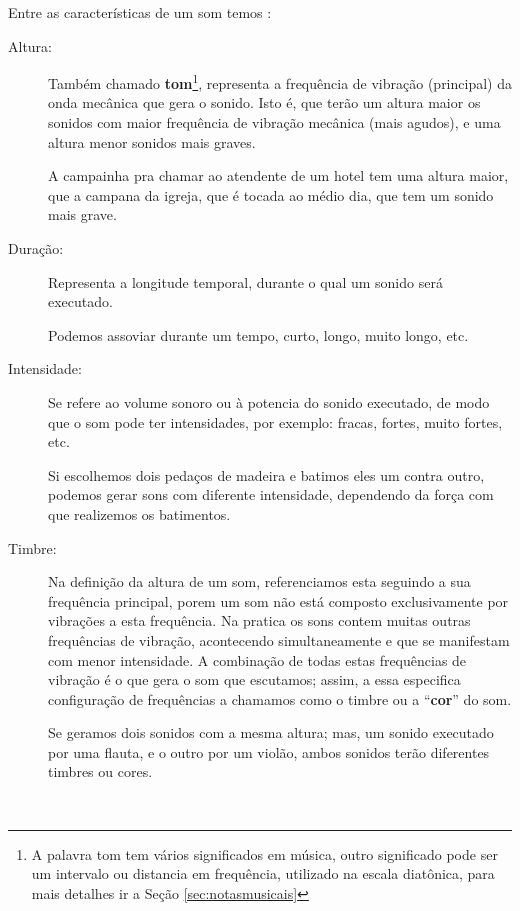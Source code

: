 Entre as características de um som temos \cite[pp. 12]{medteoria} :
\begin{description}
\item [Altura:] \label{sec:pos:Altura} 
Também chamado \textbf{tom}\footnote{A palavra tom tem vários significados em música, 
outro significado pode ser um intervalo ou distancia em frequência, 
utilizado na escala diatônica, para mais detalhes ir a Seção \ref{sec:notasmusicais}}, representa a frequência de vibração (principal) da onda mecânica que gera o sonido.
Isto é, que terão um altura maior os sonidos com maior frequência de vibração mecânica (mais agudos), 
e uma altura menor sonidos mais graves.
\begin{example}
A campainha pra chamar ao atendente de um hotel tem uma altura maior,
que a campana da igreja, que é tocada ao médio dia, que tem um sonido mais grave.
\end{example} 
\item [Duração:] \label{sec:pos:Duracion}
Representa a longitude temporal, durante o qual um sonido será executado.
\begin{example}
Podemos assoviar durante um tempo, curto, longo, muito longo, etc.
\end{example} 
\item [Intensidade:] \label{sec:pos:Intensidade}
Se refere ao volume sonoro ou à potencia do sonido executado, 
de modo que o som pode ter intensidades, por exemplo: fracas, fortes, muito fortes, etc.  
\begin{example}
Si escolhemos dois pedaços de madeira e batimos eles um contra outro, 
podemos gerar sons com diferente intensidade, dependendo da força com que realizemos os batimentos.
\end{example} 
\item [Timbre:] \label{sec:pos:timbre}
Na definição da altura de um som, referenciamos esta seguindo a sua frequência principal,
porem um som não está composto exclusivamente por vibrações a esta frequência.
Na pratica os sons contem muitas outras frequências de vibração, acontecendo simultaneamente e 
que se manifestam com menor intensidade.
A combinação de todas estas frequências de vibração é o que gera o som que escutamos;
assim, a essa especifica configuração de frequências a chamamos como o timbre ou
a ``\textbf{cor}'' do som.
\begin{example}
Se geramos dois sonidos com a mesma altura; mas, um sonido executado por uma flauta,
e o outro por um violão, ambos sonidos terão diferentes timbres ou cores.
\end{example} 
\end{description}
~\\

